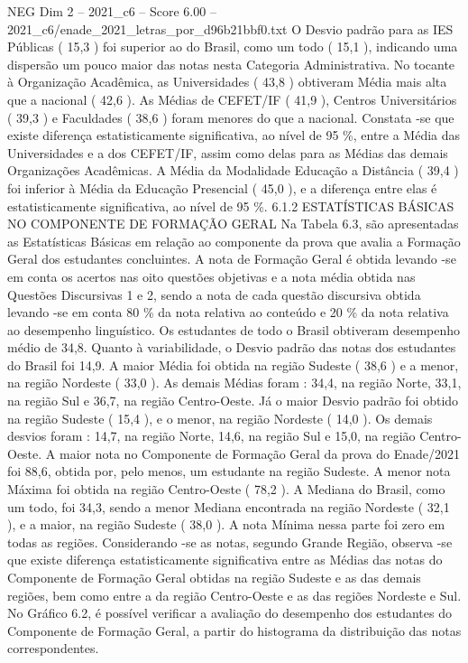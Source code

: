 \begin{textsample}{NEG Dim 2 – 2021\_c6 – Score 6.00 – 2021\_c6/enade\_2021\_letras\_por\_d96b21bbf0.txt}
O Desvio padrão para as IES Públicas ( 15,3 ) foi superior ao do Brasil, como um todo ( 15,1 ), indicando uma dispersão um pouco maior das notas nesta Categoria Administrativa.
No tocante à Organização Acadêmica, as Universidades ( 43,8 ) obtiveram Média mais alta que a nacional ( 42,6 ).
As Médias de CEFET/IF ( 41,9 ), Centros Universitários ( 39,3 ) e Faculdades ( 38,6 ) foram menores do que a nacional.
Constata -se que existe diferença estatisticamente significativa, ao nível de 95 \%, entre a Média das Universidades e a dos CEFET/IF, assim como delas para as Médias das demais Organizações Acadêmicas.
A Média da Modalidade Educação a Distância ( 39,4 ) foi inferior à Média da Educação Presencial ( 45,0 ), e a diferença entre elas é estatisticamente significativa, ao nível de 95 \%. 6.1.2 ESTATÍSTICAS BÁSICAS NO COMPONENTE DE FORMAÇÃO GERAL Na Tabela 6.3, são apresentadas as Estatísticas Básicas em relação ao componente da prova que avalia a Formação Geral dos estudantes concluintes.
A nota de Formação Geral é obtida levando -se em conta os acertos nas oito questões objetivas e a nota média obtida nas Questões Discursivas 1 e 2, sendo a nota de cada questão discursiva obtida levando -se em conta 80 \% da nota relativa ao conteúdo e 20 \% da nota relativa ao desempenho linguístico.
Os estudantes de todo o Brasil obtiveram desempenho médio de 34,8.
Quanto à variabilidade, o Desvio padrão das notas dos estudantes do Brasil foi 14,9.
A maior Média foi obtida na região Sudeste ( 38,6 ) e a menor, na região Nordeste ( 33,0 ).
As demais Médias foram : 34,4, na região Norte, 33,1, na região Sul e 36,7, na região Centro-Oeste.
Já o maior Desvio padrão foi obtido na região Sudeste ( 15,4 ), e o menor, na região Nordeste ( 14,0 ).
Os demais desvios foram : 14,7, na região Norte, 14,6, na região Sul e 15,0, na região Centro-Oeste.
A maior nota no Componente de Formação Geral da prova do Enade/2021 foi 88,6, obtida por, pelo menos, um estudante na região Sudeste.
A menor nota Máxima foi obtida na região Centro-Oeste ( 78,2 ).
A Mediana do Brasil, como um todo, foi 34,3, sendo a menor Mediana encontrada na região Nordeste ( 32,1 ), e a maior, na região Sudeste ( 38,0 ).
A nota Mínima nessa parte foi zero em todas as regiões.
Considerando -se as notas, segundo Grande Região, observa -se que existe diferença estatisticamente significativa entre as Médias das notas do Componente de Formação Geral obtidas na região Sudeste e as das demais regiões, bem como entre a da região Centro-Oeste e as das regiões Nordeste e Sul.
No Gráfico 6.2, é possível verificar a avaliação do desempenho dos estudantes do Componente de Formação Geral, a partir do histograma da distribuição das notas correspondentes.

\end{textsample}
